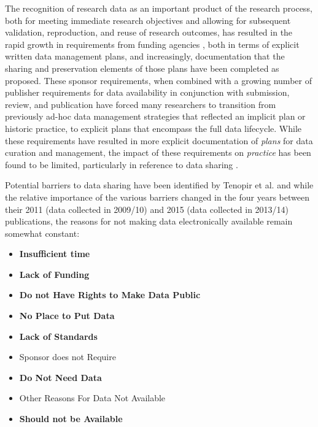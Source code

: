 \documentclass[paper]{ijdc-v9}
\providecommand{\tightlist}{%
  \setlength{\itemsep}{0pt}\setlength{\parskip}{0pt}}
\begin{document}
The recognition of research data as an important product of the research
process, both for meeting immediate research objectives and allowing for
subsequent validation, reproduction, and reuse of research outcomes, has
resulted in the rapid growth in requirements from funding agencies
\autocites{office_of_management_and_budget_omb_digital_2012}{office_of_management_and_budget_omb_memorandum_2013}{office_of_management_and_budget_omb_memorandum_2009}{obama_77_2012}{obama_executive_2013}{obama_transparency_2009}{government_of_canada_tri-agency_2017}{australian_national_data_service_data_2017}{arts_and_humanities_research_council_technical_2017}{digital_curation_centre_dcc_funders_2017},
both in terms of explicit written data management plans, and
increasingly, documentation that the sharing and preservation elements
of those plans have been completed as proposed. These sponsor
requirements, when combined with a growing number of publisher
requirements \autocites{_availability_2016}[
]{public_library_of_science_plos_data_2016} for data availability in
conjunction with submission, review, and publication have forced many
researchers to transition from previously ad-hoc data management
strategies that reflected an implicit plan or historic practice, to
explicit plans that encompass the full data lifecycle. While these
requirements have resulted in more explicit documentation of
\emph{plans} for data curation and management, the impact of these
requirements on \emph{practice} has been found to be limited,
particularly in reference to data sharing \autocite{mauthner_open_2013}.

Potential barriers to data sharing have been identified by Tenopir et
al. \autocites*{tenopir_changes_2015}{tenopir_data_2011} and while the
relative importance of the various barriers changed in the four years
between their 2011 (data collected in 2009/10) and 2015 (data collected
in 2013/14) publications, the reasons for not making data electronically
available remain somewhat constant:

\begin{itemize}
\tightlist
\item
  \textbf{Insufficient time}
\item
  \textbf{Lack of Funding}
\item
  \textbf{Do not Have Rights to Make Data Public}
\item
  \textbf{No Place to Put Data}
\item
  \textbf{Lack of Standards}
\item
  Sponsor does not Require
\item
  \textbf{Do Not Need Data}
\item
  Other Reasons For Data Not Available
\item
  \textbf{Should not be Available} \autocite[Table 12, pg. 7 - emphasis
  added]{tenopir_data_2011}
\end{itemize}
\end{document}
